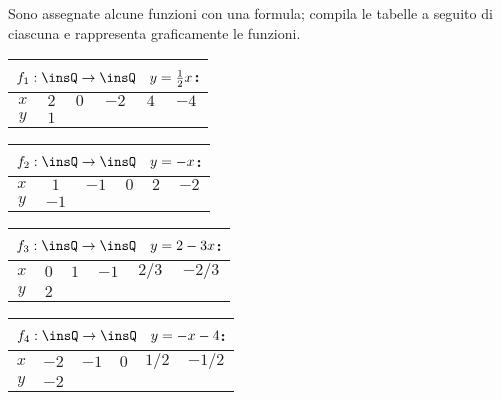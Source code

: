 \begin{esercizio}
\label{ese:\thechapter.39}
Sono assegnate alcune funzioni con una formula; compila le tabelle a seguito di ciascuna e rappresenta graficamente le funzioni.
\begin{multicols}{2}
 \begin{center}
 \begin{tabular}{cccccc}
 \multicolumn{6}{c}{$f_1:\insQ \rightarrow \insQ\quad y=\frac{1}{2}x$:}\\
 \toprule
  $x$ & $ 2 $&$ 0 $ &$ -2 $ &$ 4 $ &$ -4 $\\
  $y$ & $1$& & & & \\
\bottomrule
 \end{tabular}
 \end{center}

\begin{center}
 \begin{tabular}{cccccc}
 \multicolumn{6}{c}{ $f_2:\insQ \rightarrow \insQ\quad y=-x$:}\\
\toprule
$x$ & $1$&$ -1 $ &$ 0 $ &$ 2 $ &$ -2 $\\
$y$ & $-1$& & & & \\
\bottomrule
 \end{tabular}
\end{center}

 \begin{center}
 \begin{tabular}{cccccc}
 \multicolumn{6}{c}{ $f_3:\insQ \rightarrow \insQ\quad y=2-3x$:}\\
\toprule
$x$ & $0$&$ 1 $ &$ -1 $ &$ 2/3 $ &$ -2/3 $\\
$y$ & $2$& & & & \\
\bottomrule
 \end{tabular}
 \end{center}

 \begin{center}
 \begin{tabular}{cccccc}
 \multicolumn{6}{c}{ $f_4:\insQ \rightarrow \insQ\quad y=-x-4$:}\\
\toprule
$x$ & $-2$&$ -1 $ &$ 0 $ &$ 1/2 $ &$ -1/2 $\\
$y$ & $-2$& & & & \\
\bottomrule
 \end{tabular}
 \end{center}
\end{multicols}
\end{esercizio}


